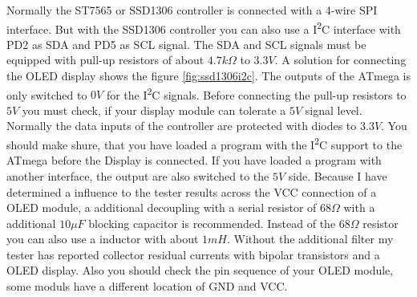 Normally the ST7565 or SSD1306 controller is connected with a 4-wire SPI interface.
But with the SSD1306 controller you can also use a I\textsuperscript{2}C interface with PD2 as SDA and PD5 as SCL signal.
The SDA and SCL signals must be equipped with pull-up resistors of about \(4.7k\Omega\) to \(3.3V\).
A solution for connecting the OLED display shows the figure  \ref{fig:ssd1306i2c}.
The outputs of the ATmega is only switched to \(0V\) for the I\textsuperscript{2}C signals.
Before connecting the pull-up resistors to \(5V\) you must check, if your display module can tolerate
a \(5V\) signal level. Normally the data inputs of the controller are protected with diodes to \(3.3V\).
You should make shure, that you have loaded a program with the I\textsuperscript{2}C support to the ATmega 
before the Display is connected. If you have loaded a program with another interface, 
the output are also switched to the \(5V\) side.
Because I have determined a influence to the tester results across the VCC connection of a OLED module,
a additional decoupling with a serial resistor of \(68\Omega\) with a additional \(10\mu F\) blocking capacitor
is recommended. Instead of the \(68\Omega\) resistor you can also use a inductor with about \(1mH\).
Without the additional filter my tester has reported collector residual currents with bipolar transistors and a
OLED display.
Also you should check the pin sequence of your OLED module, some moduls have a different location of GND and VCC.
 
